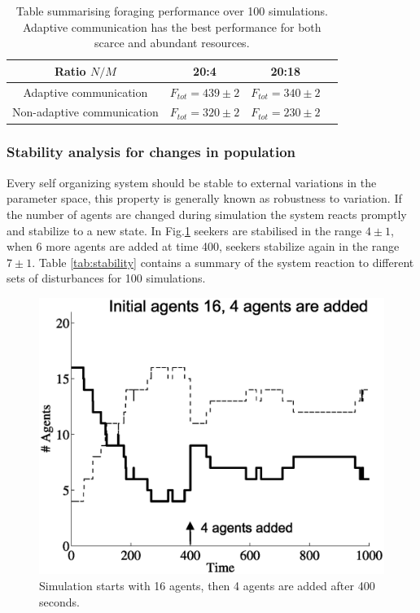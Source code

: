 \begin{table}
\renewcommand{\arraystretch}{1.3}
\caption[Foraging performance with limited resources]{
Table summarising foraging performance over 100 simulations.
Adaptive communication has the best performance for both scarce
and abundant resources.\label{tab:limitedperformance}}
\begin{center}
\begin{tabular}{@{}cccc@{}}
\hline
\hline
Ratio $N/M$ & 20:4 & 20:18\\
\hline
Adaptive communication & $F_{tot}=439\pm2$ & $F_{tot}=340\pm2$\\
\hline
Non-adaptive communication & $F_{tot}=320\pm2$ & $F_{tot}=230\pm2$\\
\end{tabular}
\end{center}
\end{table}

\subsubsection{Stability analysis for changes in population}
Every self organizing system should be stable to external variations in the 
parameter space, this property is generally known as robustness to variation.
If the number of agents are changed during simulation the system reacts promptly
and stabilize to a new state. In Fig.\ref{fig:agentAdd} seekers are stabilised
in the range $4\pm1$, when 6 more agents are added at time 400,
seekers stabilize again in the range $7\pm1$.
Table \ref{tab:stability} contains a summary of the system reaction to different
sets of disturbances for 100 simulations.

\begin{figure}[htb]
\begin{centering}
\includegraphics[width=0.6 \textwidth]{figures/socialadapt/limited/agent4more.eps}
\small{
\caption[Self organisation sensitivity to agent parameters]{
Simulation starts with 16 agents, then 4 agents are added
after 400 seconds.\label{fig:agentAdd}}
}
\end{centering}
\end{figure}

